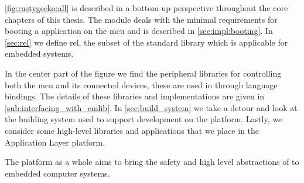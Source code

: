 \autoref{fig:rustygecko:all} is described in a bottom-up perspective throughout the core chapters of this thesis.
The  module deals with the minimal requirements for booting a {\rust} application on the \gls{mcu} and is described in \autoref{sec:impl:booting}.
In \autoref{sec:rel} we define \gls{rel}, the subset of the {\rust} standard library which is applicable for embedded systems.

In the center part of the figure we find the peripheral libraries for controlling both the \gls{mcu} and its connected devices, these are used in {\rust} through language bindings.
The details of these libraries and implementations are given in \autoref{sub:interfacing_with_emlib}.
In \autoref{sec:build_system} we take a detour and look at the building system used to support development on the {\rg} platform.
Lastly, we consider some high-level libraries and applications that we place in the Application Layer platform.

The {\rg} platform as a whole aims to bring the safety and high level abstractions of {\rust} to embedded computer systems.